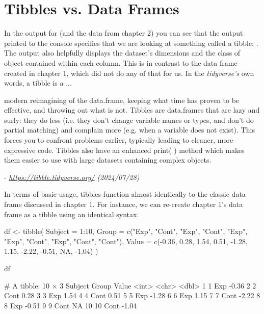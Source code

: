 \section{Tibbles vs. Data Frames}

In the output for  (and the  data from chapter 2) you can see that the output printed to the console specifies that we are looking at something called a \gls{tibble}: . The output also helpfully displays the dataset's dimensions and the class of object contained within each column. This is in contrast to the data frame created in chapter 1, which did not do any of that for us. In the \textit{tidyverse's} own words, a tibble is a ...

\begin{displayquote}
\headingfont
modern reimagining of the data.frame, keeping what time has proven to be effective, and throwing out what is not. Tibbles are data.frames that are lazy and surly: they do less (i.e. they don’t change variable names or types, and don’t do partial matching) and complain more (e.g. when a variable does not exist). This forces you to confront problems earlier, typically leading to cleaner, more expressive code. Tibbles also have an enhanced print( ) method which makes them easier to use with large datasets containing complex objects.

- \textit{\url{https://tibble.tidyverse.org/} (2024/07/28)}

\end{displayquote}

In terms of basic usage, tibbles function almost identically to the classic data frame discussed in chapter 1. For instance, we can re-create chapter 1's data frame as a tibble using an identical syntax.

\begin{inR}
df <- tibble(
  Subject = 1:10,
  Group = c("Exp", "Cont", "Exp", "Cont", "Exp", "Exp",
            "Cont", "Exp", "Cont", "Cont"),
  Value = c(-0.36,  0.28,  1.54,  0.51, -1.28,  1.15,
            -2.22, -0.51,  NA, -1.04)
)

df
\end{inR}

\begin{outR}
# A tibble: 10 × 3
   Subject Group Value
     <int> <chr> <dbl>
 1       1 Exp   -0.36
 2       2 Cont   0.28
 3       3 Exp    1.54
 4       4 Cont   0.51
 5       5 Exp   -1.28
 6       6 Exp    1.15
 7       7 Cont  -2.22
 8       8 Exp   -0.51
 9       9 Cont  NA   
10      10 Cont  -1.04
\end{outR}

